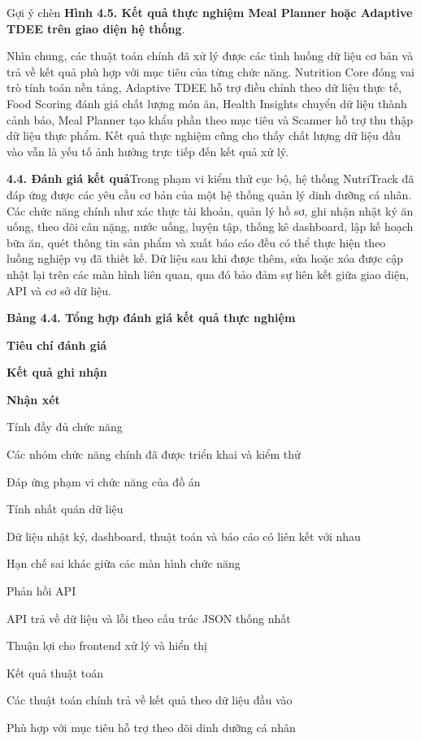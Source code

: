 Gợi ý chèn \textbf{Hình 4.5. Kết quả thực nghiệm Meal Planner hoặc Adaptive TDEE trên giao diện hệ thống}.

Nhìn chung, các thuật toán chính đã xử lý được các tình huống dữ liệu cơ bản và trả về kết quả phù hợp với mục tiêu của từng chức năng. Nutrition Core đóng vai trò tính toán nền tảng, Adaptive TDEE hỗ trợ điều chỉnh theo dữ liệu thực tế, Food Scoring đánh giá chất lượng món ăn, Health Insights chuyển dữ liệu thành cảnh báo, Meal Planner tạo khẩu phần theo mục tiêu và Scanner hỗ trợ thu thập dữ liệu thực phẩm. Kết quả thực nghiệm cũng cho thấy chất lượng dữ liệu đầu vào vẫn là yếu tố ảnh hưởng trực tiếp đến kết quả xử lý.

\textbf{4.4. Đánh giá kết quả}Trong phạm vi kiểm thử cục bộ, hệ thống NutriTrack đã đáp ứng được các yêu cầu cơ bản của một hệ thống quản lý dinh dưỡng cá nhân. Các chức năng chính như xác thực tài khoản, quản lý hồ sơ, ghi nhận nhật ký ăn uống, theo dõi cân nặng, nước uống, luyện tập, thống kê dashboard, lập kế hoạch bữa ăn, quét thông tin sản phẩm và xuất báo cáo đều có thể thực hiện theo luồng nghiệp vụ đã thiết kế. Dữ liệu sau khi được thêm, sửa hoặc xóa được cập nhật lại trên các màn hình liên quan, qua đó bảo đảm sự liên kết giữa giao diện, API và cơ sở dữ liệu.

\textbf{Bảng 4.4. Tổng hợp đánh giá kết quả thực nghiệm}

\textbf{Tiêu chí đánh giá}

\textbf{Kết quả ghi nhận}

\textbf{Nhận xét}

Tính đầy đủ chức năng

Các nhóm chức năng chính đã được triển khai và kiểm thử

Đáp ứng phạm vi chức năng của đồ án

Tính nhất quán dữ liệu

Dữ liệu nhật ký, dashboard, thuật toán và báo cáo có liên kết với nhau

Hạn chế sai khác giữa các màn hình chức năng

Phản hồi API

API trả về dữ liệu và lỗi theo cấu trúc JSON thống nhất

Thuận lợi cho frontend xử lý và hiển thị

Kết quả thuật toán

Các thuật toán chính trả về kết quả theo dữ liệu đầu vào

Phù hợp với mục tiêu hỗ trợ theo dõi dinh dưỡng cá nhân

